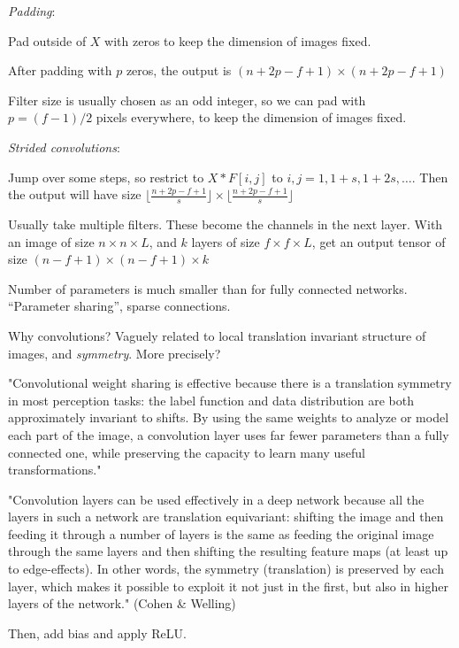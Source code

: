 \documentclass[english]{article}
\begin{document}
\item \emph{Padding}: 

Pad outside of $X$ with zeros to keep the dimension of images fixed. 

After padding with $p$ zeros, the output is $(n+2p-f+1) \times (n+2p-f+1)$

Filter size is usually chosen as an odd integer, so we can pad with $p = (f-1)/2$ pixels everywhere, to keep the dimension of images fixed. 

\item \emph{Strided convolutions}:

Jump over some steps, so restrict to $X * F[i,j]$ to $i,j=1,1+s,1+2s,\ldots$.
Then the output will have size $\lfloor \frac{n+2p-f+1}{s}\rfloor \times \lfloor \frac{n+2p-f+1}{s}\rfloor$

\item Usually take multiple filters. These become the channels in the next layer. With an image of size $n \times n \times L$, and $k$ layers of size 
$f \times f \times L$, get  an output tensor of size $(n-f+1) \times (n-f+1) \times k$ 


Number of parameters is much smaller than for fully connected networks. ``Parameter sharing'', sparse connections. %

Why convolutions? Vaguely related to local translation invariant structure of images, and \emph{symmetry}. %
More precisely?

"Convolutional weight sharing is effective because there is a translation symmetry in most perception tasks: the label function and data distribution are both approximately
invariant to shifts.  By using the same weights to analyze
or model each part of the image, a convolution layer uses
far fewer parameters than a fully connected one, while preserving the capacity to learn many useful transformations."

"Convolution layers can be used effectively in a deep network because all the layers in such a network are translation equivariant: shifting the image and then feeding
it through a number of layers is the same as feeding the
original image through the same layers and then shifting
the resulting feature maps (at least up to edge-effects). In
other words, the symmetry (translation) is preserved by
each layer, which makes it possible to exploit it not just
in the first, but also in higher layers of the network." (Cohen \& Welling)


\item Then, add bias and apply ReLU. 
 
\end{document}
